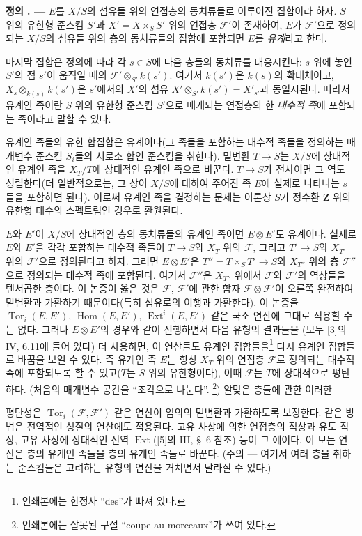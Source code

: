 \documentclass[11pt,twoside,openany]{book}
\numberwithin{equation}{section}
\newcommand{\sourceunit}{front}
\newcommand{\src}[1]{%
  \phantomsection\hypertarget{src:\sourceunit:#1}{}%
  \marginpar{\raggedleft\footnotesize\sffamily #1}%
}
\theoremstyle{plain}
\theoremstyle{definition}
\theoremstyle{remark}
\newcommand{\result}[2]{%
  \par\medskip\noindent\textbf{#1%
  \if\relax\detokenize{#2}\relax\else\space#2\fi. ---}\enspace
}
\begin{document}
\result{정의}{1.1} $E$를 $X/S$의 섬유들 위의 연접층의 동치류들로
이루어진 집합이라 하자. $S$ 위의 유한형 준스킴 $S'$과
$X'=X\times_S S'$ 위의 연접층 $\mathcal F'$이 존재하여, $E$가
$\mathcal F'$으로 정의되는 $X/S$의 섬유들 위의 층의 동치류들의 집합에
포함되면 $E$를 \emph{유계}라고 한다.

마지막 집합은 정의에 따라 각 $s\in S$에 다음 층들의 동치류를 대응시킨다:
$s$ 위에 놓인 $S'$의 점 $s'$이 움직일 때의
$\mathcal F'\otimes_{S'}k(s')$. 여기서 $k(s')$은 $k(s)$의 확대체이고,
$X_s\otimes_{k(s)}k(s')$은 $s'$에서의 $X'$의 섬유
$X'\otimes_{S'}k(s')=X'_{s'}$과 동일시된다. 따라서 유계인 족이란
$S$ 위의 유한형 준스킴 $S'$으로 매개되는 연접층의 한 \emph{대수적 족}에
포함되는 족이라고 말할 수 있다.

유계인 족들의 유한 합집합은 유계이다(그 족들을 포함하는 대수적 족들을
정의하는 매개변수 준스킴 $S_i$들의 서로소 합인 준스킴을 취한다).
밑변환 $T\longrightarrow S$는 $X/S$에 상대적인 유계인 족을
$X_T/T$에 상대적인 유계인 족으로 바꾼다. $T\longrightarrow S$가
전사이면 그 역도 성립한다(더 일반적으로는, 그 상이 $X/S$에 대하여 주어진
족 $E$에 실제로 나타나는 $s$들을 포함하면 된다). 이로써 유계인 족을
결정하는 문제는 이론상 $S$가 정수환 $\mathbf Z$ 위의 유한형 대수의
스펙트럼인 경우로 환원된다.

$E$와 $E'$이 $X/S$에 상대적인 층의 동치류들의 유계인 족이면
$E\otimes E'$도 유계이다. 실제로 $E$와 $E'$을 각각 포함하는 대수적
족들이 $T\longrightarrow S$와 $X_T$ 위의 $\mathcal F$, 그리고
$T'\longrightarrow S$와 $X_{T'}$ 위의 $\mathcal F'$으로 정의된다고
하자. 그러면 $E\otimes E'$은 $T''=T\times_S T'\longrightarrow S$와
$X_{T''}$ 위의 층 $\mathcal F''$으로 정의되는 대수적 족에 포함된다.
여기서 $\mathcal F''$은 $X_{T''}$ 위에서 $\mathcal F$와 $\mathcal F'$의
역상들을 텐서곱한 층이다. 이 논증이 옳은 것은 $\mathcal F$, $\mathcal F'$에
관한 함자 $\mathcal F\otimes\mathcal F'$이 오른쪽 완전하여 밑변환과
가환하기 때문이다(특히 섬유로의 이행과 가환한다). 이 논증을
$\operatorname{Tor}_i(E,E')$, $\operatorname{Hom}(E,E')$,
$\operatorname{Ext}^i(E,E')$ 같은 국소 연산에 그대로 적용할 수는 없다.
그러나 $E\otimes E'$의 경우와 같이 진행하면서 다음 유형의 결과들을
(모두 [3]의 IV, 6.11에 들어 있다) 더 사용하면, 이 연산들도 유계인
집합들을\footnote{인쇄본에는 한정사 ``des''가
빠져 있다.} 다시 유계인 집합들로 바꿈을 보일 수 있다. 즉 유계인 족 $E$는
항상 $X_T$ 위의 연접층 $\mathcal F$로 정의되는 대수적 족에 포함되도록
할 수 있고($T$는 $S$ 위의 유한형이다), 이때 $\mathcal F$는 $T$에
상대적으로 평탄하다. (처음의 매개변수 공간을 ``조각으로
나눈다''.
\footnote{인쇄본에는 잘못된 구절 ``coupe au
morceaux''가 쓰여 있다.}) 알맞은 층들에 관한 이러한
\src{252}
평탄성은 $\operatorname{Tor}_i(\mathcal F,\mathcal F')$ 같은 연산이
임의의 밑변환과 가환하도록 보장한다. 같은 방법은 전역적인 성질의 연산에도
적용된다. 고유 사상에 의한 연접층의 직상과 유도 직상, 고유 사상에 상대적인
전역 $\operatorname{Ext}$([5]의 III, \S~6 참조) 등이 그 예이다. 이 모든
연산은 층의 유계인 족들을 층의 유계인 족들로 바꾼다. (주의 --- 여기서
여러 층을 취하는 준스킴들은 고려하는 유형의 연산을 거치면서 달라질 수 있다.)
\end{document}
